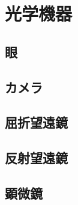 \section{光学機器}
	\subsection{眼}
	\subsection{カメラ}
	\subsection{屈折望遠鏡}
	\subsection{反射望遠鏡}
	\subsection{顕微鏡}